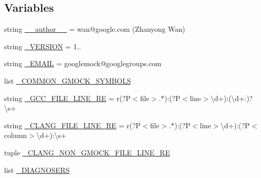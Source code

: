 \subsection*{Variables}
\begin{DoxyCompactItemize}
\item 
string \mbox{\hyperlink{namespacegoogletest-master_1_1googlemock_1_1scripts_1_1gmock__doctor_a25557db21c9badbabd387cce26bf8f82}{\+\_\+\+\_\+author\+\_\+\+\_\+}} = \textquotesingle{}wan@google.\+com (Zhanyong Wan)\textquotesingle{}
\item 
string \mbox{\hyperlink{namespacegoogletest-master_1_1googlemock_1_1scripts_1_1gmock__doctor_a58d27c674ecb09edef5074b2ae14b9a7}{\+\_\+\+V\+E\+R\+S\+I\+ON}} = \textquotesingle{}1..\textquotesingle{}
\item 
string \mbox{\hyperlink{namespacegoogletest-master_1_1googlemock_1_1scripts_1_1gmock__doctor_ac463bf700b1338cd5efc04ef90baec07}{\+\_\+\+E\+M\+A\+IL}} = \textquotesingle{}googlemock@googlegroups.\+com\textquotesingle{}
\item 
list \mbox{\hyperlink{namespacegoogletest-master_1_1googlemock_1_1scripts_1_1gmock__doctor_a84da9e9a1e618bb99545b5271b8a814c}{\+\_\+\+C\+O\+M\+M\+O\+N\+\_\+\+G\+M\+O\+C\+K\+\_\+\+S\+Y\+M\+B\+O\+LS}}
\item 
string \mbox{\hyperlink{namespacegoogletest-master_1_1googlemock_1_1scripts_1_1gmock__doctor_abb25fbe1d844d7980efa19b0bfb25dac}{\+\_\+\+G\+C\+C\+\_\+\+F\+I\+L\+E\+\_\+\+L\+I\+N\+E\+\_\+\+RE}} = r\textquotesingle{}(?P$<$file$>$.$\ast$)\+:(?P$<$line$>$\textbackslash{}d+)\+:(\textbackslash{}d+\+:)?\textbackslash{}s+\textquotesingle{}
\item 
string \mbox{\hyperlink{namespacegoogletest-master_1_1googlemock_1_1scripts_1_1gmock__doctor_ae3705af4faaeb3b450d0138a87db1fc8}{\+\_\+\+C\+L\+A\+N\+G\+\_\+\+F\+I\+L\+E\+\_\+\+L\+I\+N\+E\+\_\+\+RE}} = r\textquotesingle{}(?P$<$file$>$.$\ast$)\+:(?P$<$line$>$\textbackslash{}d+)\+:(?P$<$column$>$\textbackslash{}d+)\+:\textbackslash{}s+\textquotesingle{}
\item 
tuple \mbox{\hyperlink{namespacegoogletest-master_1_1googlemock_1_1scripts_1_1gmock__doctor_a11f2128432c289a894a5184a2f58ad5c}{\+\_\+\+C\+L\+A\+N\+G\+\_\+\+N\+O\+N\+\_\+\+G\+M\+O\+C\+K\+\_\+\+F\+I\+L\+E\+\_\+\+L\+I\+N\+E\+\_\+\+RE}}
\item 
list \mbox{\hyperlink{namespacegoogletest-master_1_1googlemock_1_1scripts_1_1gmock__doctor_a6f0e420cd9ef5e04ef716c7f03ed44bb}{\+\_\+\+D\+I\+A\+G\+N\+O\+S\+E\+RS}}
\end{DoxyCompactItemize}


